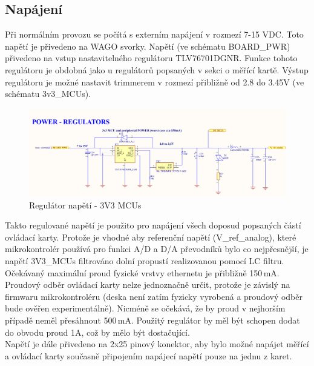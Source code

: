 \clearpage
    \subsection{Napájení}
    Při normálním provozu se počítá s externím napájení v rozmezí 7-15 VDC.
    Toto napětí je přivedeno na WAGO svorky. Napětí (ve schématu BOARD\_PWR)
    přivedeno na vstup nastavitelného regulátoru TLV76701DGNR. Funkce tohoto regulátoru je obdobná
    jako u regulátorů popsaných v sekci o měřící kartě. Výstup regulátoru je možné
    nastavit trimmerem v rozmezí přibližně od 2.8 do 3.45V (ve schématu 3v3\_MCUs).\\

    \begin{figure}[ht!]
        \centering
        \includegraphics[width = 1\textwidth]{obrazky/PWR_REG_3V3.png}
        \caption{Regulátor napětí - 3V3 MCUs}
        \label{fig:Regulátor napětí - 3V3 MCUs}
    \end{figure}

    Takto regulované napětí je použito pro napájení všech doposud popsaných částí ovládací karty.
    Protože je vhodné aby referenční napětí (V\_ref\_analog),
    které mikrokontrolér používá  pro funkci A/D a D/A převodníků bylo co nejpřesnější, je
    napětí 3V3\_MCUs filtrováno dolní propustí realizovanou pomocí LC filtru.\\

    Očekávaný maximální proud fyzické vrstvy ethernetu je přibližně 150\,mA.
    Proudový odběr ovládací karty nelze jednoznačně určit,
    protože je závislý na firmwaru mikrokontroléru (deska není zatím fyzicky vyrobená a
    proudový odběr bude ověřen experimentálně).
    Nicméně se očekává, že by proud v nejhorším případě neměl přesáhnout 500\,mA. 
    Použitý regulátor by měl být schopen dodat do obvodu proud 1A, což by
    mělo být dostačující.\\ 
    
    Napětí je dále přivedeno na 2x25 pinový konektor,
    aby bylo možné napájet měřící a ovládací karty současně připojením napájecí napětí pouze
    na jednu z karet.\\

